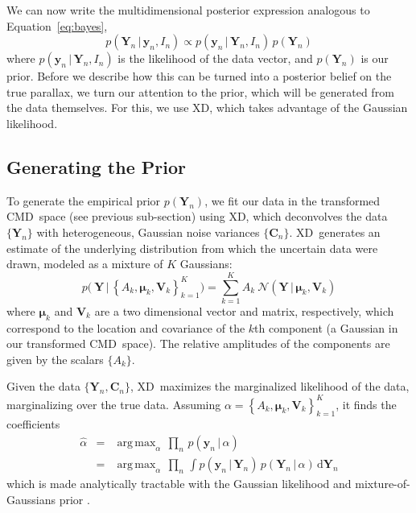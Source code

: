 \documentclass[modern]{aastex61}
\newcommand{\acronym}[1]{{\small{#1}}}
\newcommand{\xd}{\acronym{XD}}
\newcommand{\cmd}{\acronym{CMD}}
\DeclareMathOperator*{\argmax}{arg\,max}
\newcommand{\given}{\,|\,}
\newcommand{\dd}{\mathrm{d}}
\renewcommand{\vec}[1]{\boldsymbol{{#1}}}
\newcommand{\truth}{\vec{Y}}
\newcommand{\data}{\vec{y}}
\newcommand{\mean}{\vec{\mu}}
\newcommand{\mat}[1]{{\mathbf{{#1}}}}
\newcommand{\var}{\mat{V}}
\newcommand{\covar}{\mat{C}}
\begin{document}
We can now write the multidimensional posterior expression analogous to Equation~\ref{eq:bayes},
\begin{equation}
p(\truth_n \given \data_n, I_n) \propto p(\data_n \given \truth_n, I_n) \, p(\truth_n) \label{eq:posterior}
\end{equation}
where $p(\data_n \given \truth_n, I_n)$ is the likelihood of the data vector, and $p(\truth_n)$ is our prior.
Before we describe how this can be turned into a posterior belief on the true parallax, we turn our attention to the prior, which will be generated from the data themselves. For this, we use XD, which takes advantage of the Gaussian likelihood.

\subsection{Generating the Prior}

To generate the empirical prior $p(\truth_n)$,
we fit our data in the transformed \cmd\ space (see previous sub-section) using \xd,
which deconvolves the data $\{ \truth_n \}$ with heterogeneous,
Gaussian noise variances $\{ \covar_n\}$. \xd\ generates an estimate of the underlying distribution from which the uncertain data were drawn, modeled as a mixture of $K$ Gaussians:
\begin{equation}
	p\bigl(\ \truth \given  \left\{A_k, \mean_k, \var_k\right\}_{k=1}^K \bigr) = \sum_{k=1}^K A_k \ \mathcal{N}(\truth \given \mean_k, \var_k )
\end{equation}
where $\mean_k$ and $\var_k$ are a two dimensional vector and matrix, respectively, which correspond to the location and covariance of the $k$th component (a Gaussian in our transformed \cmd\ space). The relative amplitudes of the components are given by the scalars $\{ A_k \}$.

Given the data $\{ \truth_n, \covar_n\}$, \xd\ maximizes the marginalized likelihood of the data, marginalizing over the true data. Assuming $\alpha = \left\{A_k, \mean_k, \var_k\right\}_{k=1}^K$, it finds the coefficients
\begin{eqnarray}
\hat{\alpha} &=& \argmax_{\alpha} \, \prod_n \, p(\data_n \given \alpha) \nonumber\\
             &=& \argmax_{\alpha} \, \prod_n \, \int p(\data_n \given \truth_n) \, p(\truth_n \given \alpha)\, \dd\truth_n
\label{eq:xdmml}
\end{eqnarray}
which is made analytically tractable with the Gaussian likelihood and mixture-of-Gaussians prior \citep{bovy11}.
\end{document}

